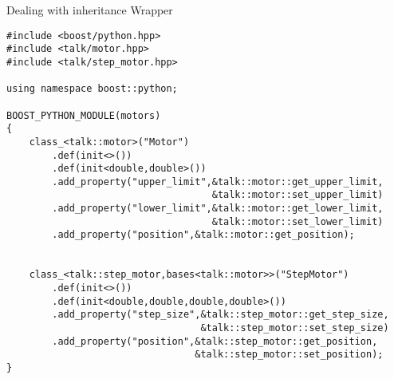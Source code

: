 \begin{frame}[fragile]{Dealing with inheritance}
    Wrapper 
    \begin{verbatim}
#include <boost/python.hpp>
#include <talk/motor.hpp>
#include <talk/step_motor.hpp>

using namespace boost::python;

BOOST_PYTHON_MODULE(motors)
{
    class_<talk::motor>("Motor")
        .def(init<>())
        .def(init<double,double>())
        .add_property("upper_limit",&talk::motor::get_upper_limit,
                                    &talk::motor::set_upper_limit)
        .add_property("lower_limit",&talk::motor::get_lower_limit,
                                    &talk::motor::set_lower_limit)
        .add_property("position",&talk::motor::get_position);
                       

    class_<talk::step_motor,bases<talk::motor>>("StepMotor")
        .def(init<>())
        .def(init<double,double,double,double>())
        .add_property("step_size",&talk::step_motor::get_step_size,
                                  &talk::step_motor::set_step_size)
        .add_property("position",&talk::step_motor::get_position,
                                 &talk::step_motor::set_position);
}
    \end{verbatim}
\end{frame}




